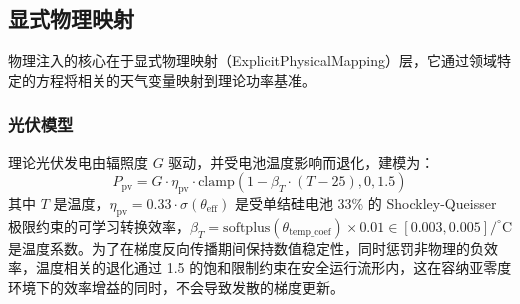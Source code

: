 \subsection{显式物理映射}
物理注入的核心在于显式物理映射（ExplicitPhysicalMapping）层，它通过领域特定的方程将相关的天气变量映射到理论功率基准。

\subsubsection{光伏模型}
理论光伏发电由辐照度 $G$ 驱动，并受电池温度影响而退化，建模为：
\begin{equation}
    P_{\text{pv}} = G \cdot \eta_{\text{pv}} \cdot \text{clamp}(1 - \beta_T \cdot (T - 25), 0, 1.5)
\label{eq:pv_model}
\end{equation}
其中 $T$ 是温度，$\eta_{\text{pv}} = 0.33 \cdot \sigma(\theta_{\text{eff}})$ 是受单结硅电池 33\% 的 Shockley-Queisser 极限约束的可学习转换效率，$\beta_T = \text{softplus}(\theta_{\text{temp\_coef}}) \times 0.01 \in [0.003, 0.005]/^\circ\text{C}$ 是温度系数。为了在梯度反向传播期间保持数值稳定性，同时惩罚非物理的负效率，温度相关的退化通过 1.5 的饱和限制约束在安全运行流形内，这在容纳亚零度环境下的效率增益的同时，不会导致发散的梯度更新。

